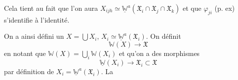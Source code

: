 Cela tient au fait que l'on aura $X_{ijh}\simeq\underline{\mathbb W}^a(\mathfrak X_i\cap\mathfrak X_j\cap\mathfrak X_k)$ et que   $\varphi_{ji}$ (p. ex) s'identifie à l'identité.

On a ainsi défini un $X=\bigcup X_i$, $X_i\simeq\underline{\mathbb W}^a(\mathfrak X_i)$. On définit
\[
 \mathbb W(X)\longrightarrow\mathfrak X
\]
en notant que $\mathbb W(X)=\bigcup_i\mathbb W(X_i)$  et qu'on a des  morphismes
\[
 \underline{\mathbb W}(X_i)\longrightarrow\mathfrak X_i\subset\mathfrak X
\]
par définition de $X_i=\underline{\mathbb W}^a(\mathfrak X_i)$. La
